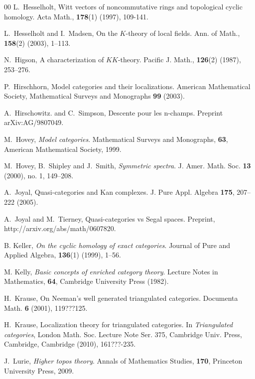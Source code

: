 \documentclass{amsart}
\numberwithin{equation}{section}
\theoremstyle{definition}
\begin{document}
\begin{thebibliography}{00}
 L.~Hesselholt,
\newblock Witt vectors of noncommutative rings and topological cyclic
  homology.
\newblock Acta Math., {\bf 178}(1) (1997), 109-141.

 L.~Hesselholt and I.~Madsen,
\newblock On the {$K$}-theory of local fields.
\newblock Ann. of Math., {\bf 158}(2) (2003), 1--113.

 N.~Higson,
\newblock A characterization of {$KK$}-theory.
\newblock Pacific J. Math., {\bf 126}(2) (1987), 253--276.

 P.~Hirschhorn,
\newblock Model categories and their localizations. 
\newblock American Mathematical Society, Mathematical Surveys and
Monographs {\bf 99} (2003).

 A.~Hirschowitz. and C.~Simpson,
\newblock Descente pour les n-champs.
\newblock Preprint arXiv:AG/9807049.

 M.~Hovey, {\em Model categories}. Mathematical Surveys and Monographs, {\bf 63}, American Mathematical Society, 1999.

 M.~Hovey, B.~Shipley and J.~Smith, {\em Symmetric
  spectra}. J. Amer. Math. Soc. {\bf 13} (2000), no. 1, 149--208.

 A.~Joyal, 
\newblock Quasi-categories and Kan complexes. 
\newblock J. Pure Appl. Algebra {\bf 175}, 207--222 (2005).

 A.~Joyal and M.~Tierney, {Quasi-categories vs Segal spaces}. Preprint, http://arxiv.org/abs/math/0607820.

 B. Keller, {\em On the cyclic homology of exact
categories}.  Journal of Pure and Applied Algebra, {\bf 136}(1)
(1999), 1--56.

 M. Kelly, {\em Basic concepts of enriched category theory}.
Lecture Notes in Mathematics, {\bf 64}, Cambridge University Press (1982).

 H.~Krause,
\newblock On {N}eeman's well generated triangulated categories.
\newblock Documenta Math. {\bf 6} (2001), 119???125.

 H.~Krause,
\newblock Localization theory for triangulated categories.
\newblock In {\em Triangulated categories}, London Math. Soc. Lecture
Note Ser. 375, Cambridge Univ. Press, Cambridge, Cambridge (2010),
161???-235.

 J.~Lurie, {\em Higher topos theory}. Annals of Mathematics Studies, {\bf 170}, Princeton University Press, 2009.


\end{thebibliography}
\end{document}
